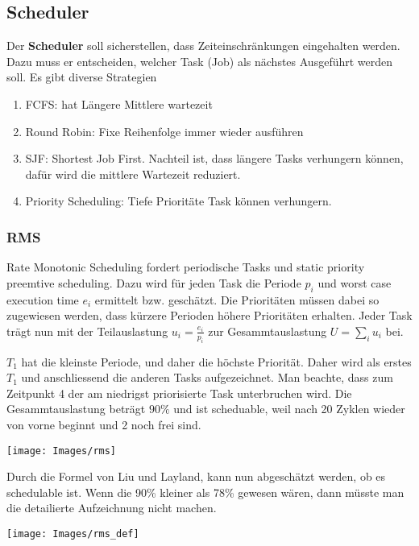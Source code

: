 \subsection{Scheduler}
Der \textbf{Scheduler} soll sicherstellen, dass Zeiteinschränkungen eingehalten werden. Dazu muss er entscheiden, welcher Task (Job) als nächstes Ausgeführt werden soll. Es gibt diverse Strategien
\begin{enumerate}
	\item FCFS: hat Längere Mittlere wartezeit
	\item Round Robin: Fixe Reihenfolge immer wieder ausführen
	\item SJF: Shortest Job First. Nachteil ist, dass längere Tasks verhungern können, dafür wird die mittlere Wartezeit reduziert.
	\item Priority Scheduling: Tiefe Prioritäte Task können verhungern.
\end{enumerate}

\subsubsection{RMS}
Rate Monotonic Scheduling fordert periodische Tasks und static priority preemtive scheduling. Dazu wird für jeden Task die Periode $p_i$ und worst case execution time $e_i$ ermittelt bzw. geschätzt. Die Prioritäten müssen dabei so zugewiesen werden, dass kürzere Perioden höhere Prioritäten erhalten. Jeder Task trägt nun mit der Teilauslastung $u_i = \frac{e_i}{p_i}$ zur Gesammtauslastung $U = \sum_{i}^{}u_i$ bei.

$T_1$ hat die kleinste Periode, und daher die höchste Priorität. Daher wird als erstes $T_1$ und anschliessend die anderen Tasks aufgezeichnet. Man beachte, dass zum Zeitpunkt 4 der am niedrigst priorisierte Task unterbruchen wird. Die Gesammtauslastung beträgt $90\%$ und ist scheduable, weil nach 20 Zyklen wieder von vorne beginnt und 2 noch frei sind.
\begin{center}
	\texttt{[image: Images/rms]}
\end{center}

Durch die Formel von Liu und Layland, kann nun abgeschätzt werden, ob es schedulable ist. Wenn die 90\% kleiner als 78\% gewesen wären, dann müsste man die detailierte Aufzeichnung nicht machen.
\begin{center}
	\texttt{[image: Images/rms\_def]}
\end{center}

